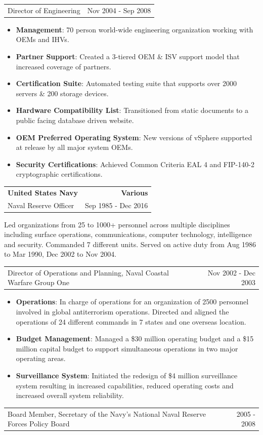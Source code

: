 \documentclass[letterpaper,11pt]{article}
\makeatletter
\newcommand{\resumeCompanyHeading}[4]{
  \vspace{-1pt}
    \item
    \begin{tabular*}{1.0\textwidth}[t]{l@{\extracolsep{\fill}}r}
      \textbf{#1} & \textbf{#2} \\
      {#3} & {#4}
    \end{tabular*}\vspace{-10pt}
  }
\newcommand{\resumeCompanyPositionHeading}[2]{
      \item
      \begin{tabular*}{1.0\textwidth}{l@{\extracolsep{\fill}}r}
        {#1} & {#2}
    \end{tabular*}\vspace{-10pt}
}
\newcommand{\resumeJobDescription}[1][]{
    \vspace{-1pt}\par{#1}
}
\newcommand{\resumeItem}[2]{\item{{\textbf{\small#1}}: {\small#2 \vspace{-1pt}}}}
\newcommand{\resumeItemListStart}{\begin{itemize}}
\newcommand{\resumeItemListEnd}{\end{itemize}}\vspace{-10pt}
\makeatother
\begin{document}
          \resumeCompanyPositionHeading
            {Director of Engineering}
            {Nov 2004 - Sep 2008}
            \resumeItemListStart
                \resumeItem{Management}{70 person world-wide engineering organization working with OEMs and IHVs.}
                \resumeItem{Partner Support}{Created a 3-tiered OEM \& ISV support model that increased coverage of partners.}
                \resumeItem{Certification Suite}{Automated testing suite that supports over 2000 servers \& 200 storage devices.}
                \resumeItem{Hardware Compatibility List}{Transitioned from static documents to a public facing database driven website.}
                \resumeItem{OEM Preferred Operating System}{New versions of vSphere supported at release by all major system OEMs.}
                \resumeItem{Security Certifications}{Achieved Common Criteria EAL 4 and FIP-140-2 cryptographic certifications.}
            \resumeItemListEnd

        \resumeCompanyHeading
          {United States Navy}{Various}
          {Naval Reserve Officer}{Sep 1985 - Dec 2016}
          \resumeJobDescription{Led organizations from 25 to 1000+ personnel across multiple disciplines including surface operations, communications,
          computer technology, intelligence and security. Commanded 7 different units. Served on active duty from Aug 1986 to Mar 1990, Dec 2002 to Nov 2004.}

          \resumeCompanyPositionHeading
            {Director of Operations and Planning, Naval Coastal Warfare Group One}
            {Nov 2002 - Dec 2003}
            \resumeItemListStart
                \resumeItem{Operations}{In charge of operations for an organization of 2500 personnel involved in global antiterrorism operations.
                  Directed and aligned the operations of 24 different commands in 7 states and one overseas location.}
                \resumeItem{Budget Management}{Managed a \$30 million operating budget and a \$15 million capital budget to support simultaneous
                  operations in two major operating areas.}
                \resumeItem{Surveillance System}{Initiated the redesign of \$4 million surveillance system resulting in increased capabilities,
                  reduced operating costs and increased overall system reliability.}
            \resumeItemListEnd

          \resumeCompanyPositionHeading
            {Board Member, Secretary of the Navy's National Naval Reserve Forces Policy Board}
            {2005 - 2008}
\end{document}
